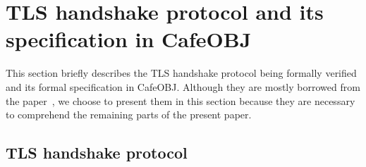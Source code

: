 \documentclass[a4paper,fleqn]{cas-dc}
\begin{document}


\section{TLS handshake protocol and its specification in CafeOBJ}
\label{tls}

This section briefly describes the TLS handshake protocol being formally verified and its formal specification in CafeOBJ.
Although they are mostly borrowed from the paper~\cite{ogata05},
we choose to present them in this section because
they are necessary to comprehend the remaining parts of the present paper.

\subsection{TLS handshake protocol}
\end{document}

